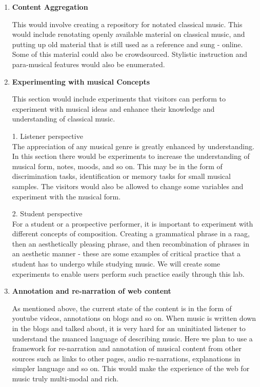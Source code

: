 \documentclass{tufte-handout}
\begin{document}
\begin{enumerate}

\item \textbf{Content Aggregation}

  This would involve creating a repository for notated
  classical music. This would include renotating openly
  available material on classical music, and putting up old
  material that is still used as a reference and sung -
  online. Some of this material could also be
  crowdsourced. Stylistic instruction and para-musical
  features would also be enumerated.

\item \textbf{Experimenting with musical Concepts}

  This section would include experiments that visitors can
  perform to experiment with musical ideas and enhance their
  knowledge and understanding of classical music.


1. Listener perspective \\

The appreciation of any musical genre is greatly enhanced by
understanding. In this section there would be experiments to
increase the understanding of musical form, notes, moods,
and so on. This may be in the form of discrimination tasks,
identification or memory tasks for small musical
samples. The visitors would also be allowed to change some
variables and experiment with the musical form.

2. Student perspective\\

For a student or a prospective performer, it is important to
experiment with different concepts of composition. Creating
a grammatical phrase in a raag, then an aesthetically
pleasing phrase, and then recombination of phrases in an
aesthetic manner - these are some examples of critical
practice that a student has to undergo while studying
music. We will create some experiments to enable users
perform such practice easily through this lab.

\item \textbf{Annotation and re-narration of web content}

  As mentioned above, the current state of the content is in
  the form of youtube videos, annotations on blogs and so
  on. When music is written down in the blogs and talked
  about, it is very hard for an uninitiated listener to
  understand the nuanced language of describing music. Here
  we plan to use a framework for re-narration and annotation
  of musical content from other sources such as links to
  other pages, audio re-narrations, explanations in simpler
  language and so on. This would make the experience of the
  web for music truly multi-modal and rich.

\end{enumerate}
\end{document}
